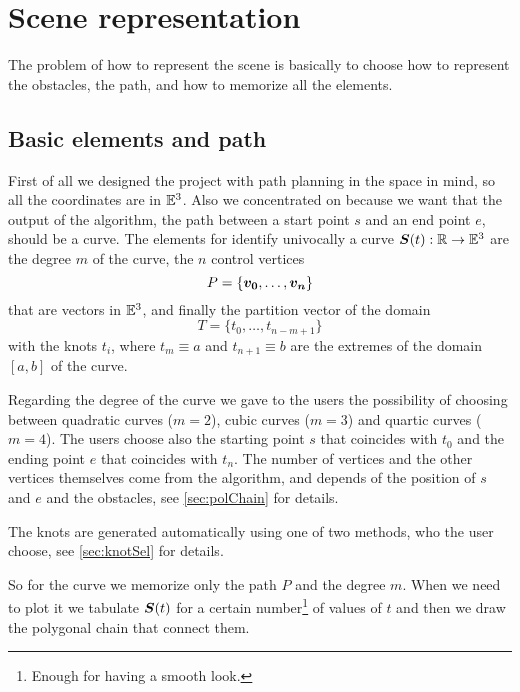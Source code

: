 \documentclass[dissertation.tex]{subfiles}
\begin{document}
\chapter{Scene representation}\label{cha:scene}
The problem of how to represent the scene is basically to choose how
to represent the obstacles, the path, and how to memorize all the
elements.

\section{Basic elements and path}
First of all we designed the project with path planning in the space
in mind, so all the coordinates are in $\mathbb{E}^3$. Also we concentrated
on \bss because we want that the output of the algorithm, the
path between a start point $s$ and an end point $e$, should be a \bs
curve. The elements for identify univocally a curve
$\boldsymbol{S}(t):\mathbb{R}\rightarrow\mathbb{E}^3$ are the
degree $m$ of the curve, the $n$ control vertices
\begin{equation*}
  P=\{\boldsymbol{v_0},\dots,\boldsymbol{v_n}\}
\end{equation*}
that are vectors in $\mathbb{E}^3$, and finally the partition vector of the domain
\begin{equation*}
  T=\{t_0,\dots,t_{n-m+1}\}
\end{equation*}
with the knots $t_i$, where $t_m\equiv a$ and $t_{n+1}\equiv b$ are
the extremes of the domain $[a,b]$ of the curve.

Regarding the degree of the curve we gave
to the users the possibility of choosing between quadratic curves
($m=2$), cubic curves ($m=3$) and quartic curves ($m=4$). The users
choose also the starting point $s$ that coincides with $t_0$ and the
ending point $e$ that coincides with $t_n$. The number
of vertices and the other vertices themselves come from the algorithm,
and depends of the position of $s$ and $e$ and the obstacles, see
\cref{sec:polChain} for details.

The knots are generated automatically using one of two methods, who the
user choose, see \cref{sec:knotSel} for details.

So for the curve we memorize only the path $P$ and the degree
$m$. When we need to plot it we tabulate $\boldsymbol{S}(t)$ for a certain
number\footnote{Enough for having a smooth look.} of values of $t$ and
then we draw the polygonal chain that connect them.
\end{document}
